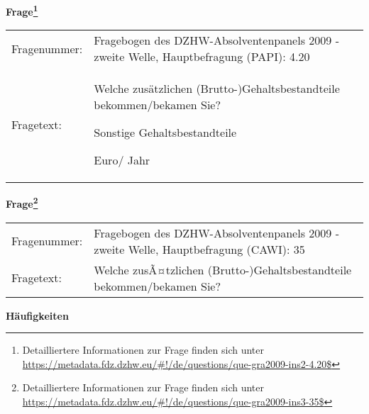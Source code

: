 				\vspace*{0.5cm}
                \noindent\textbf{Frage\footnote{Detailliertere Informationen zur Frage finden sich unter
		              \url{https://metadata.fdz.dzhw.eu/\#!/de/questions/que-gra2009-ins2-4.20$}}}\\
				\begin{tabularx}{\hsize}{@{}lX}
					Fragenummer: &
					  Fragebogen des DZHW-Absolventenpanels 2009 - zweite Welle, Hauptbefragung (PAPI):
					  4.20
 \\
					Fragetext: & Welche zusätzlichen (Brutto-)Gehaltsbestandteile bekommen/bekamen Sie?\par  Sonstige Gehaltsbestandteile\par  Euro/ Jahr \\
				\end{tabularx}
				\vspace*{0.5cm}
                \noindent\textbf{Frage\footnote{Detailliertere Informationen zur Frage finden sich unter
		              \url{https://metadata.fdz.dzhw.eu/\#!/de/questions/que-gra2009-ins3-35$}}}\\
				\begin{tabularx}{\hsize}{@{}lX}
					Fragenummer: &
					  Fragebogen des DZHW-Absolventenpanels 2009 - zweite Welle, Hauptbefragung (CAWI):
					  35
 \\
					Fragetext: & Welche zusÃ¤tzlichen (Brutto-)Gehaltsbestandteile bekommen/bekamen Sie? \\
				\end{tabularx}





        		\vspace*{0.5cm}
                \noindent\textbf{Häufigkeiten}

